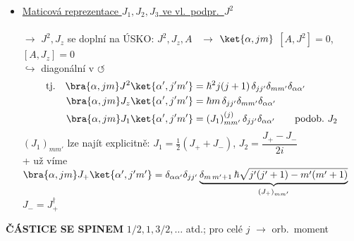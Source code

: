 \begin{itemize}
  \item \underline{Maticová reprezentace $J_1,J_2,J_3$ ve vl.\ podpr.\ $J^2$} \\
   \\
  $\to$ $J^2, J_z$ se doplní na ÚSKO: $J^2, J_z, A$ \ $\to$ $\ket{\alpha,jm}$ \hfill $[A,J^2] = 0$, \ $[A,J_z] = 0$ \\
  \hspace*{4.3cm} $\hookrightarrow$ diagonální v $\circlearrowleft$ \hfill {}
  \begin{align*}
    \text{tj.}\quad \bra{\alpha,jm}J^2\ket{\alpha',j'm'} &= \hbar^2 j(j+1)\,\delta_{jj'}\delta_{mm'}\delta_{\alpha\alpha'} \\
    \bra{\alpha,jm}J_z\ket{\alpha',j'm'} &= \hbar m\,\delta_{jj'}\delta_{mm'}\delta_{\alpha\alpha'} \\
    \bra{\alpha,jm}J_1\ket{\alpha',j'm'} &= (J_1)^{(j)}_{mm'}\,\delta_{jj'}\delta_{\alpha\alpha'} \qquad\text{podob.\ } J_2
  \end{align*}
  $(J_1)_{mm'}$ lze najít explicitně: \quad $J_1 = \frac12(J_+ + J_-)$, \quad $J_2 = \dfrac{J_+ - J_-}{2i}$ \\
  + už víme \quad $\bra{\alpha,jm}J_+\ket{\alpha',j'm'} = \delta_{\alpha\alpha'}\delta_{jj'}\underbrace{\delta_{m\,m'+1}\,\hbar\sqrt{j'(j'+1) - m'(m'+1)}}_{(J_+)_{mm'}}$ \\
  \hspace*{4cm} $J_- = J_+^\dagger$
\end{itemize}

\textbf{ČÁSTICE SE SPINEM} $1/2, 1, 3/2,\dots$ atd.; pro celé $j$ $\to$ orb.\ moment

